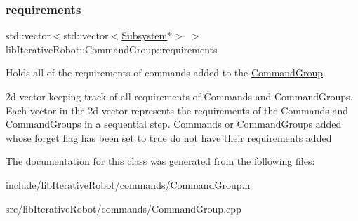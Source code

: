 \subsubsection{\texorpdfstring{requirements}{requirements}}
{\footnotesize\ttfamily std\+::vector$<$std\+::vector$<$\mbox{\hyperlink{classlib_iterative_robot_1_1_subsystem}{Subsystem}}$\ast$$>$ $>$ lib\+Iterative\+Robot\+::\+Command\+Group\+::requirements\hspace{0.3cm}{\ttfamily [private]}}



Holds all of the requirements of commands added to the \mbox{\hyperlink{classlib_iterative_robot_1_1_command_group}{Command\+Group}}. 

2d vector keeping track of all requirements of Commands and Command\+Groups. Each vector in the 2d vector represents the requirements of the Commands and Command\+Groups in a sequential step. Commands or Command\+Groups added whose forget flag has been set to true do not have their requirements added 

The documentation for this class was generated from the following files\+:\begin{DoxyCompactItemize}
\item 
include/lib\+Iterative\+Robot/commands/Command\+Group.\+h\item 
src/lib\+Iterative\+Robot/commands/Command\+Group.\+cpp\end{DoxyCompactItemize}
